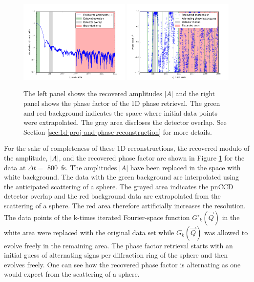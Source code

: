 \begin{figure}
	\centering
		\includegraphics[width=0.49\textwidth]{images/results/amplitude-discussion.png}
		\includegraphics[width=0.49\textwidth]{images/results/phase-discussion.png}
	\caption[Recovered Amplitudes $\lvert A\rvert$ and phase factor of 1D reconstruction]{The left panel shows the recovered amplitudes $\lvert A\rvert$ and the right panel shows the phase factor of the 1D phase retrieval. The green and red background indicates the space where initial data points were extrapolated. The gray area discloses the detector overlap. See Section \ref{sec:1d-proj-and-phase-reconstruction} for more details.}
	\label{fig:amplitude-phase}
\end{figure}
For the sake of completeness of these 1D reconstructions, the recovered modulo of the amplitude, $\lvert A\rvert$, and the recovered phase factor are shown in Figure \ref{fig:amplitude-phase} for the data at $\Delta t =$ \SI{800}{\femto\second}. The amplitudes $\lvert A\rvert$ have been replaced in the space with white background. The data with the green background are interpolated using the anticipated scattering of a sphere. The grayed area indicates the pnCCD detector overlap and the red background data are extrapolated from the scattering of a sphere. The red area therefore artificially increases the resolution. The data points of the k-times iterated Fourier-space function $G'_{k}(\vec{Q})$ in the white area were replaced with the original data set while $G_{k}(\vec{Q})$ was allowed to evolve freely in the remaining area. The phase factor retrieval starts with an initial guess of alternating signs per diffraction ring of the sphere and then evolves freely. One can see how the recovered phase factor is alternating as one would expect from the scattering of a sphere.
%
%
%
